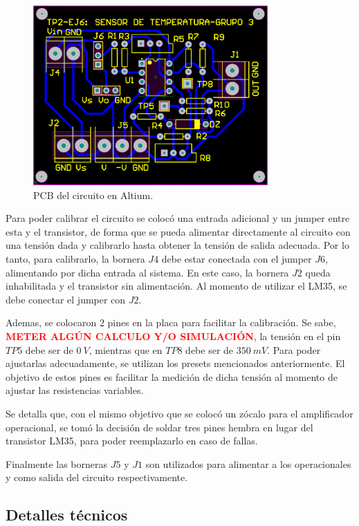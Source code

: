\documentclass[a4paper]{article}
\begin{document}
\begin{figure}[H]
	\centering
	\includegraphics[width=0.8\textwidth]{Ejercicio6/Imagenes/PCB.png}
	\caption{PCB del circuito en Altium.}
	\label{fig:PCB}
\end{figure}

Para poder calibrar el circuito se colocó una entrada adicional y un jumper entre esta y el transistor, de forma que se pueda alimentar directamente al circuito con una tensión dada y calibrarlo hasta obtener la tensión de salida adecuada. Por lo tanto, para calibrarlo, la bornera $J4$ debe estar conectada con el jumper $J6$, alimentando por dicha entrada al sistema. En este caso, la bornera $J2$ queda inhabilitada y el transistor sin alimentación.
Al momento de utilizar el LM35, se debe conectar el jumper con $J2$.

Ademas, se colocaron 2 pines en la placa para facilitar la calibración. Se sabe, \textcolor{red}{\textbf{METER ALGÚN CALCULO Y/O SIMULACIÓN}}, la tensión en el pin $TP5$ debe ser de $0 \ V$, mientras que en $TP8$ debe ser de $350 \ mV$. Para poder ajustarlas adecuadamente, se utilizan los presets mencionados anteriormente. El objetivo de estos pines es facilitar la medición de dicha tensión al momento de ajustar las resistencias variables.

Se detalla que, con el mismo objetivo que se colocó un zócalo para el amplificador operacional, se tomó la decisión de soldar tres pines hembra en lugar del transistor LM35, para poder reemplazarlo en caso de fallas.

Finalmente las borneras $J5$ y $J1$ son utilizados para alimentar a los operacionales y como salida del circuito respectivamente.

\subsection{Detalles técnicos}
\end{document}
